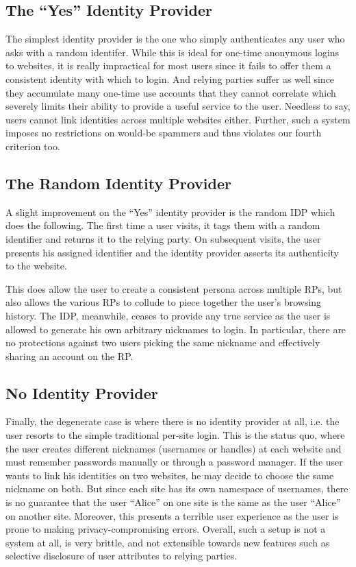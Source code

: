 \documentclass{llncs}
\begin{document}

\subsection{The ``Yes'' Identity Provider}

The simplest identity provider is the one who simply authenticates any user who
asks with a random identifer. While this is ideal for one-time anonymous logins
to websites, it is really impractical for most users since it fails to offer
them a consistent identity with which to login. And relying parties suffer as
well since they accumulate many one-time use accounts that they cannot correlate
which severely limits their ability to provide a useful service to the user.
Needless to say, users cannot link identities across multiple websites either.
Further, such a system imposes no restrictions on would-be spammers and thus
violates our fourth criterion too.

\subsection{The Random Identity Provider}

A slight improvement on the ``Yes'' identity provider is the random IDP which
does the following. The first time a user visits, it tags them with a random
identifier and returns it to the relying party. On subsequent visits, the user
presents his assigned identifier and the identity provider asserts its
authenticity to the website.

This does allow the user to create a consistent persona across multiple RPs, but
also allows the various RPs to collude to piece together the user's browsing
history. The IDP, meanwhile, ceases to provide any true service as the user is
allowed to generate his own arbitrary nicknames to login. In particular, there
are no protections against two users picking the same nickname and effectively
sharing an account on the RP.

\subsection{No Identity Provider}

Finally, the degenerate case is where there is no identity provider at all, i.e.
the user resorts to the simple traditional per-site login. This is the status
quo, where the user creates different nicknames (usernames or handles) at each
website and must remember passwords manually or through a password manager. If
the user wants to link his identities on two websites, he may decide to choose
the same nickname on both. But since each site has its own namespace of
usernames, there is no guarantee that the user ``Alice'' on one site is the same
as the user ``Alice'' on another site. Moreover, this presents a terrible user
experience as the user is prone to making privacy-compromising errors. Overall,
such a setup is not a system at all, is very brittle, and not extensible towards
new features such as selective disclosure of user attributes to relying parties.
\end{document}
